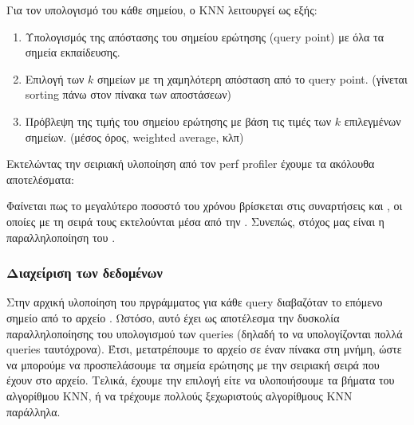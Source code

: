 \documentclass[11pt]{scrartcl} %
\begin{document}
Για τον υπολογισμό του κάθε σημείου, ο KNN λειτουργεί ως εξής:

\begin{enumerate}
    \item Υπολογισμός της απόστασης του σημείου ερώτησης (query point) με όλα τα σημεία εκπαίδευσης.
    \item Επιλογή των $k$ σημείων με τη χαμηλότερη απόσταση από το query point. (γίνεται sorting πάνω στον πίνακα των αποστάσεων)
    \item Πρόβλεψη της τιμής του σημείου ερώτησης με βάση τις τιμές των $k$ επιλεγμένων σημείων. (μέσος όρος, weighted average, κλπ)
\end{enumerate}

Εκτελώντας την σειριακή υλοποίηση από τον perf profiler έχουμε τα ακόλουθα αποτελέσματα:



Φαίνεται πως το μεγαλύτερο ποσοστό του χρόνου βρίσκεται στις συναρτήσεις  και , οι οποίες με τη σειρά τους εκτελούνται 
μέσα από την . Συνεπώς, στόχος μας είναι η παραλληλοποίηση του .

\subsubsection{Διαχείριση των δεδομένων}

Στην αρχική υλοποίηση του πργράμματος για κάθε query διαβαζόταν το επόμενο σημείο από το αρχείο . 
Ωστόσο, αυτό έχει ως αποτέλεσμα την δυσκολία παραλληλοποίησης του υπολογισμού των queries (δηλαδή το να υπολογίζονται πολλά queries ταυτόχρονα).
Έτσι, μετατρέπουμε το αρχείο  σε έναν πίνακα στη μνήμη, ώστε να μπορούμε να προσπελάσουμε τα σημεία ερώτησης με την σειριακή σειρά που έχουν στο αρχείο.
Τελικά, έχουμε την επιλογή είτε να υλοποιήσουμε τα βήματα του αλγορίθμου KNN, ή να τρέχουμε πολλούς ξεχωριστούς αλγορίθμους KNN παράλληλα.
\end{document}
